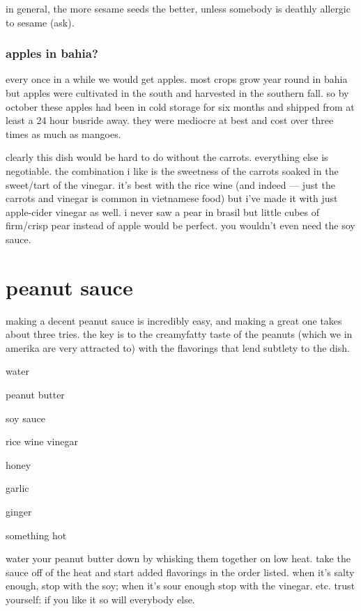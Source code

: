 in general, the more sesame seeds the better, unless somebody is deathly 
allergic to sesame (ask).

\subsubsection{apples in bahia?}

every once in a while we would get apples. most crops grow year round in bahia 
but apples were cultivated in the south and harvested in the southern fall. so 
by october these apples had been in cold storage for six months and shipped 
from at least a 24 hour busride away. they were mediocre at best and cost over 
three times as much as mangoes.

clearly this dish would be hard to do without the carrots. everything else is 
negotiable. the combination i like is the sweetness of the carrots soaked in 
the sweet/tart of the vinegar. it's best with the rice wine (and indeed --- 
just the carrots and vinegar is common in vietnamese food) but i've made it 
with just apple-cider vinegar as well. i never saw a pear in brasil but little 
cubes of firm/crisp pear instead of apple would be perfect. you wouldn't even 
need the soy sauce.

\section{peanut sauce}

making a decent peanut sauce is incredibly easy, and making a great one takes 
about three tries. the key is to  the creamyfatty taste of the peanuts 
(which we in amerika are very attracted to) with the flavorings that lend 
subtlety to the dish.

\begin{ingredients}
  \item water
  \item peanut butter
  \item soy sauce
  \item rice wine vinegar
  \item honey
  \item garlic
  \item ginger
  \item something hot
\end{ingredients}

water your peanut butter down by whisking them together on low heat. take the 
sauce off of the heat and start added flavorings in the order listed. when 
it's salty enough, stop with the soy; when it's sour enough stop with the 
vinegar. etc. trust yourself: if you like it so will everybody else.

